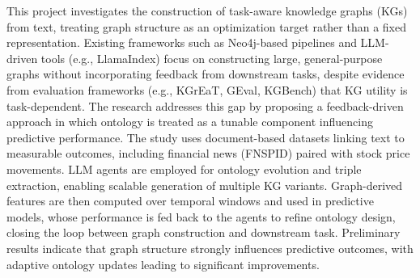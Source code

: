 This project investigates the construction of task-aware knowledge graphs (KGs) from text,
treating graph structure as an optimization target rather than a fixed representation.
Existing frameworks such as Neo4j-based pipelines and LLM-driven tools (e.g., LlamaIndex)
focus on constructing large, general-purpose graphs without incorporating feedback from
downstream tasks, despite evidence from evaluation frameworks (e.g., KGrEaT, GEval, KGBench)
that KG utility is task-dependent. The research addresses this gap by proposing a
feedback-driven approach in which ontology is treated as a tunable component influencing
predictive performance. The study uses document-based datasets linking text to measurable
outcomes, including financial news (FNSPID) paired with stock price movements. LLM agents
are employed for ontology evolution and triple extraction, enabling scalable generation of
multiple KG variants. Graph-derived features are then computed over temporal windows and
used in predictive models, whose performance is fed back to the agents to refine ontology
design, closing the loop between graph construction and downstream task. Preliminary results
indicate that graph structure strongly influences predictive outcomes, with adaptive ontology
updates leading to significant improvements.

